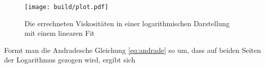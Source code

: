 \begin{figure}
    \centering
    \texttt{[image: build/plot.pdf]}
    \caption{Die errechneten Viskositäten in einer logarithmischen Darstellung mit einem linearen Fit}
    \label{fig:groKu_steigendeTemp_eta_fit}
\end{figure}
%
\noindent
Formt man die Andradesche Gleichung \eqref{eq:andrade} so um, dass auf beiden Seiten der Logarithmus gezogen wird, ergibt sich
